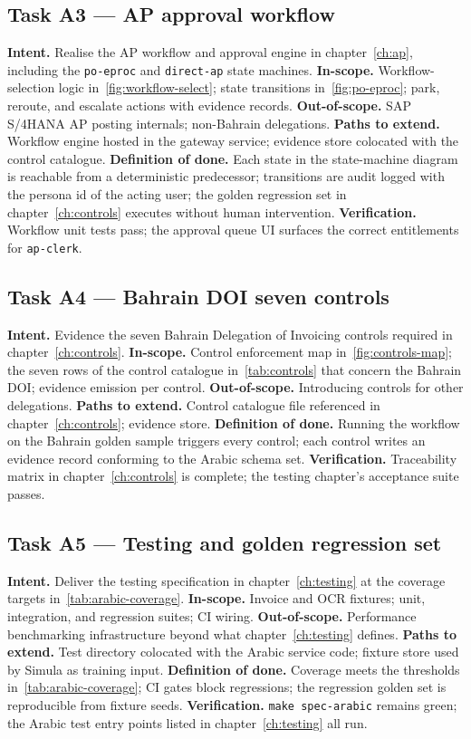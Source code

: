 \subsection*{Task A3 --- AP approval workflow}
\textbf{Intent.} Realise the AP workflow and approval engine in
chapter~\ref{ch:ap}, including the \texttt{po-eproc} and
\texttt{direct-ap} state machines.
\textbf{In-scope.} Workflow-selection logic in~\ref{fig:workflow-select};
state transitions in~\ref{fig:po-eproc}; park, reroute, and escalate
actions with evidence records.
\textbf{Out-of-scope.} SAP S/4HANA AP posting internals;
non-Bahrain delegations.
\textbf{Paths to extend.} Workflow engine hosted in the gateway
service; evidence store colocated with the control catalogue.
\textbf{Definition of done.} Each state in the state-machine diagram
is reachable from a deterministic predecessor; transitions are audit
logged with the persona id of the acting user; the golden regression
set in chapter~\ref{ch:controls} executes without human intervention.
\textbf{Verification.} Workflow unit tests pass; the approval queue
UI surfaces the correct entitlements for \texttt{ap-clerk}.

\subsection*{Task A4 --- Bahrain DOI seven controls}
\textbf{Intent.} Evidence the seven Bahrain Delegation of Invoicing
controls required in chapter~\ref{ch:controls}.
\textbf{In-scope.} Control enforcement map in~\ref{fig:controls-map};
the seven rows of the control catalogue in~\ref{tab:controls} that
concern the Bahrain DOI; evidence emission per control.
\textbf{Out-of-scope.} Introducing controls for other delegations.
\textbf{Paths to extend.} Control catalogue file referenced in
chapter~\ref{ch:controls}; evidence store.
\textbf{Definition of done.} Running the workflow on the Bahrain
golden sample triggers every control; each control writes an
evidence record conforming to the Arabic schema set.
\textbf{Verification.} Traceability matrix in chapter~\ref{ch:controls}
is complete; the testing chapter's acceptance suite passes.

\subsection*{Task A5 --- Testing and golden regression set}
\textbf{Intent.} Deliver the testing specification in
chapter~\ref{ch:testing} at the coverage targets
in~\ref{tab:arabic-coverage}.
\textbf{In-scope.} Invoice and OCR fixtures; unit, integration, and
regression suites; CI wiring.
\textbf{Out-of-scope.} Performance benchmarking infrastructure beyond
what chapter~\ref{ch:testing} defines.
\textbf{Paths to extend.} Test directory colocated with the Arabic
service code; fixture store used by Simula as training input.
\textbf{Definition of done.} Coverage meets the thresholds
in~\ref{tab:arabic-coverage}; CI gates block regressions; the
regression golden set is reproducible from fixture seeds.
\textbf{Verification.} \texttt{make spec-arabic} remains green; the
Arabic test entry points listed in chapter~\ref{ch:testing} all run.


